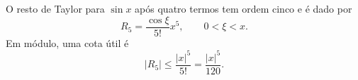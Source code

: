 O resto de Taylor para $\sin x$ após quatro termos tem ordem cinco e é dado por
\[
R_{5}=\frac{\cos\xi}{5!}x^{5},\qquad 0<\xi<x.
\]
Em módulo, uma cota útil é
\[
|R_{5}| \le \frac{|x|^{5}}{5!} = \frac{|x|^{5}}{120}.
\]
